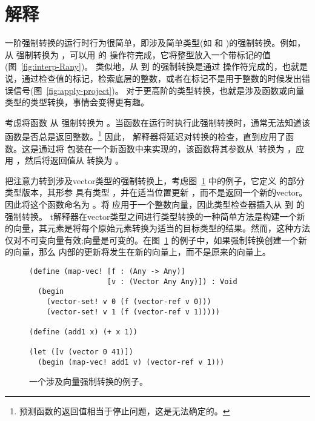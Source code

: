 \documentclass[11pt]{book}
\begin{document}
\clearpage

\section{解释 \LangCast{}}
\label{sec:interp-casts}

一阶强制转换的运行时行为很简单，即涉及简单类型(如  和
 )的强制转换。例如，从  强制转换为 
，可以用 \LangAny{} 的  操作符完成，它将整型放入一个带标记的值(图~\ref{fig:interp-Rany})。 类似地，从  到  的强制转换是通过  操作符完成的，也就是说，通过检查值的标记，检索底层的整数，或者在标记不是用于整数的时候发出错误信号(图~\ref{fig:apply-project})。
%
对于更高阶的类型转换，也就是涉及函数或向量类型的类型转换，事情会变得更有趣。

考虑将函数  从  强制转换为  。当函数在运行时执行此强制转换时，通常无法知道该函数是否总是返回整数。\footnote{预测函数的返回值相当于停止问题，这是无法确定的。}  因此， \LangCast{} 解释器将延迟对转换的检查，直到应用了函数。这是通过将  包装在一个新函数中来实现的，该函数将其参数从  '转换为  ，应用  ，然后将返回值从  转换为  。

把注意力转到涉及vector类型的强制转换上，考虑图~\ref{fig:map-vec-bang} 中的例子，它定义  的部分类型版本，其形参  具有类型  ，并在适当位置更新  ，而不是返回一个新的vector。因此将这个函数命名为  。将  应用于一个整数向量，因此类型检查器插入从 
到  的强制转换。 \LangCast{} t解释器在vector类型之间进行类型转换的一种简单方法是构建一个新的向量，其元素是将每个原始元素转换为适当的目标类型的结果。然而，这种方法仅对不可变向量有效;向量是可变的。在图~\ref{fig:map-vec-bang} 的例子中，如果强制转换创建一个新的向量，那么  内部的更新将发生在新的向量上，而不是原来的向量上。

\begin{figure}[tbp]
\begin{lstlisting}
(define (map-vec! [f : (Any -> Any)]
                  [v : (Vector Any Any)]) : Void
  (begin
    (vector-set! v 0 (f (vector-ref v 0)))
    (vector-set! v 1 (f (vector-ref v 1)))))

(define (add1 x) (+ x 1))

(let ([v (vector 0 41)])
  (begin (map-vec! add1 v) (vector-ref v 1)))
\end{lstlisting}
\caption{一个涉及向量强制转换的例子。}
\label{fig:map-vec-bang}
\end{figure}
\end{document}
